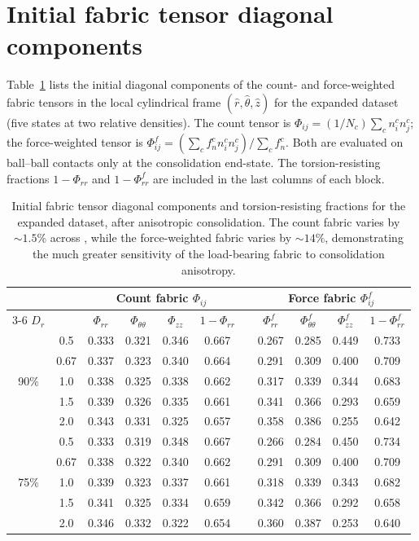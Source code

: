 \section{Initial fabric tensor diagonal components}
\label{sec:appendix_fabric}

Table~\ref{tab:fabric_diagonal} lists the initial diagonal components of the count- and force-weighted fabric tensors in the local cylindrical frame $(\hat{r},\hat{\theta},\hat{z})$ for the expanded dataset (five \Kzero{} states at two relative densities). The count tensor is $\Phi_{ij} = (1/N_c)\sum_c n_i^c n_j^c$; the force-weighted tensor is $\Phi^f_{ij} = (\sum_c f_n^c n_i^c n_j^c) / \sum_c f_n^c$. Both are evaluated on ball--ball contacts only at the consolidation end-state. The torsion-resisting fractions $1 - \Phi_{rr}$ and $1 - \Phi^f_{rr}$ are included in the last columns of each block.

\begin{table}[h]
\centering
\caption{Initial fabric tensor diagonal components and torsion-resisting fractions for the expanded dataset, after anisotropic consolidation. The count fabric varies by ${\sim}1.5\%$ across \Kzero{}, while the force-weighted fabric varies by ${\sim}14\%$, demonstrating the much greater sensitivity of the load-bearing fabric to consolidation anisotropy.}
\label{tab:fabric_diagonal}
\small
\setlength{\tabcolsep}{4pt}
\begin{tabular}{ccccccccccc}
\toprule
& & \multicolumn{4}{c}{Count fabric $\Phi_{ij}$} & & \multicolumn{4}{c}{Force fabric $\Phi^f_{ij}$} \\
\cmidrule{3-6} \cmidrule{8-11}
$D_r$ & \Kzero{} & $\Phi_{rr}$ & $\Phi_{\theta\theta}$ & $\Phi_{zz}$ & $1{-}\Phi_{rr}$ & & $\Phi^f_{rr}$ & $\Phi^f_{\theta\theta}$ & $\Phi^f_{zz}$ & $1{-}\Phi^f_{rr}$ \\
\midrule
\multirow{5}{*}{90\%}
& 0.5  & 0.333 & 0.321 & 0.346 & 0.667 & & 0.267 & 0.285 & 0.449 & 0.733 \\
& 0.67 & 0.337 & 0.323 & 0.340 & 0.664 & & 0.291 & 0.309 & 0.400 & 0.709 \\
& 1.0  & 0.338 & 0.325 & 0.338 & 0.662 & & 0.317 & 0.339 & 0.344 & 0.683 \\
& 1.5  & 0.339 & 0.326 & 0.335 & 0.661 & & 0.341 & 0.366 & 0.293 & 0.659 \\
& 2.0  & 0.343 & 0.331 & 0.325 & 0.657 & & 0.358 & 0.386 & 0.255 & 0.642 \\
\midrule
\multirow{5}{*}{75\%}
& 0.5  & 0.333 & 0.319 & 0.348 & 0.667 & & 0.266 & 0.284 & 0.450 & 0.734 \\
& 0.67 & 0.338 & 0.322 & 0.340 & 0.662 & & 0.291 & 0.309 & 0.400 & 0.709 \\
& 1.0  & 0.339 & 0.323 & 0.337 & 0.661 & & 0.318 & 0.339 & 0.343 & 0.682 \\
& 1.5  & 0.341 & 0.325 & 0.334 & 0.659 & & 0.342 & 0.366 & 0.292 & 0.658 \\
& 2.0  & 0.346 & 0.332 & 0.322 & 0.654 & & 0.360 & 0.387 & 0.253 & 0.640 \\
\bottomrule
\end{tabular}
\end{table}
